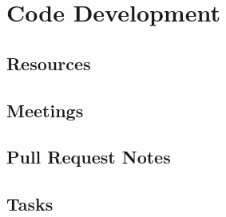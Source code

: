 \documentclass[oneside]{book}
\begin{document}
\part{Code Development}   


    \chapter{Resources}
        
        

    \chapter{Meetings}
        
    
         
        
    \chapter{Pull Request Notes}
         
       


    \chapter{Tasks}
        
\end{document}
